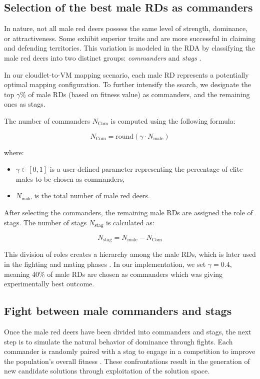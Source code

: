 \documentclass[pdflatex,sn-mathphys-num]{sn-jnl}%
\theoremstyle{thmstyleone}%
\theoremstyle{thmstyletwo}%
\theoremstyle{thmstylethree}%
\begin{document}
\subsection{Selection of the best male RDs as commanders}\label{subsec4.3}
In nature, not all male red deers possess the same level of strength, dominance, or attractiveness. Some exhibit superior traits and are more successful in claiming and defending territories. This variation is modeled in the RDA by classifying the male red deers into two distinct groups: \textit{commanders} and \textit{stags} \cite{red_deer}.

In our cloudlet-to-VM mapping scenario, each male RD represents a potentially optimal mapping configuration. To further intensify the search, we designate the top $\gamma$\% of male RDs (based on fitness value) as commanders, and the remaining ones as stags.

The number of commanders \( N_{\text{Com}} \) is computed using the following formula:

\begin{equation}
N_{\text{Com}} = \text{round}( \gamma \cdot N_{\text{male}} )
\end{equation}

\noindent where:
\begin{itemize}
    \item \( \gamma \in [0, 1] \) is a user-defined parameter representing the percentage of elite males to be chosen as commanders,
    \item \( N_{\text{male}} \) is the total number of male red deers.
\end{itemize}

After selecting the commanders, the remaining male RDs are assigned the role of stags. The number of stags \( N_{\text{stag}} \) is calculated as:

\begin{equation}
N_{\text{stag}} = N_{\text{male}} - N_{\text{Com}}
\end{equation}

This division of roles creates a hierarchy among the male RDs, which is later used in the fighting and mating phases \cite{red_deer}. In our implementation, we set \( \gamma = 0.4 \), meaning 40\% of male RDs are chosen as commanders which was giving experimentally best outcome.

\subsection{Fight between male commanders and stags}\label{subsec4.4}
Once the male red deers have been divided into commanders and stags, the next step is to simulate the natural behavior of dominance through fights. Each commander is randomly paired with a stag to engage in a competition to improve the population's overall fitness \cite{red_deer}. These confrontations result in the generation of new candidate solutions through exploitation of the solution space.
\end{document}
